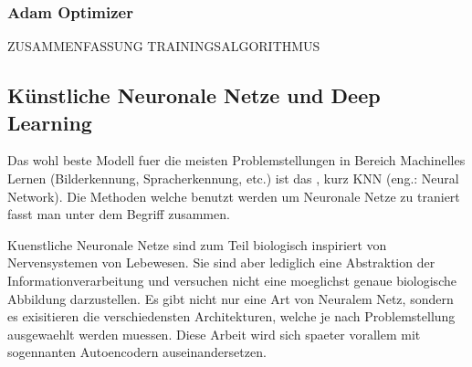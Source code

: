 \documentclass[../main]{subfiles}
\begin{document}
\subsubsection{Adam Optimizer}
ZUSAMMENFASSUNG TRAININGSALGORITHMUS

\pagebreak
\subsection{Künstliche Neuronale Netze und Deep Learning}
Das wohl beste Modell fuer die meisten Problemstellungen in Bereich Machinelles Lernen (Bilderkennung, Spracherkennung, etc.) ist das , kurz KNN (eng.: Neural Network).
Die Methoden welche benutzt werden um Neuronale Netze zu traniert fasst man unter dem Begriff  zusammen.

Kuenstliche Neuronale Netze sind zum Teil biologisch inspiriert von Nervensystemen von Lebewesen. Sie sind aber lediglich eine Abstraktion der Informationverarbeitung und versuchen nicht eine moeglichst genaue biologische Abbildung darzustellen.
Es gibt nicht nur eine Art von Neuralem Netz, sondern es exisitieren die
verschiedensten Architekturen, welche je nach Problemstellung ausgewaehlt werden
muessen. Diese Arbeit wird sich spaeter vorallem mit sogennanten Autoencodern auseinandersetzen.
\end{document}

